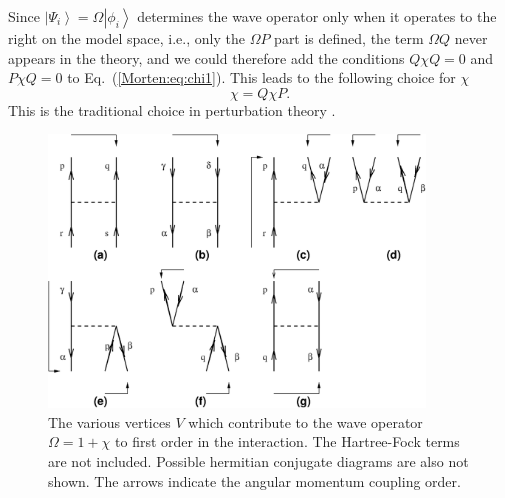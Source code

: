Since  $\left|\Psi_i\right\rangle=\Omega\left|\phi_i\right\rangle$ 
determines the wave operator
only when it operates to the right on the model space, i.e., only the
$\Omega P$  part is defined, the term $\Omega Q$
never appears in the theory,
and we could therefore add the conditions $Q\chi Q =0$ and $P\chi Q =0$
to Eq.~(\ref{Morten:eq:chi1}). This leads to the following choice for $\chi$
\begin{equation}
                   \chi = Q\chi P. \label{Morten:eq:chi2}
\end{equation}
This is the traditional choice in perturbation theory \cite{Morten:so95,Morten:lm85}.

\begin{figure}[tbh]
	\begin{center}
      	\includegraphics[width=10cm]{vertex.eps}
	\end{center}
      \caption{The various vertices 
               $V$ which contribute to the wave operator
               $\Omega =1+\chi$ to first order in the interaction. 
               The Hartree-Fock
               terms are not included. Possible hermitian conjugate 
                diagrams are also not shown. The arrows indicate the 
               angular momentum coupling order.}
      \label{Morten:fig:wavef1}
\end{figure}



